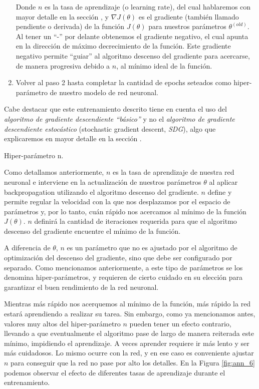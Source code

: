 \documentclass[12pt,a4paper]{article}
\makeatletter
\renewcommand\paragraph{\@startsection{paragraph}{4}{\z@}
            {-2.5ex\@plus -1ex \@minus -.25ex}
            {1.25ex \@plus .25ex}
            {\normalfont\normalsize\bfseries}}
\makeatother
\begin{document}
\begin{sloppypar}
\begin{enumerate}
Donde $n$ es la tasa de aprendizaje (o learning rate), del cual hablaremos con mayor detalle en la sección \textit{}, y $\nabla J(\theta)$ es el gradiente (también llamado pendiente o derivada) de la función $J(\theta)$ para nuestros parámetros $\theta^{(old)}$. Al tener un “-” por delante obtenemos el gradiente negativo, el cual apunta en la dirección de máximo decrecimiento de la función. Este gradiente negativo permite “guiar” al algoritmo descenso del gradiente para acercarse, de manera progresiva debido a $n$, al mínimo ideal de la función.      

\item Volver al paso 2 hasta completar la cantidad de epochs seteados como hiper-parámetro de nuestro modelo de red neuronal. 

\end{enumerate}

Cabe destacar que este entrenamiento descrito tiene en cuenta el uso del \textit{algoritmo de gradiente descendiente “básico”} y no el \textit{algoritmo de gradiente descendiente estocástico} (stochastic gradient descent, \textit{SDG}), algo que explicaremos en mayor detalle en la sección \textit{}.

\paragraph{Hiper-parámetro n.}\label{hiper_n}

Como detallamos anteriormente, $n$ es la tasa de aprendizaje de nuestra red neuronal e interviene en la actualización de nuestros parámetros $\theta$ al aplicar backpropagation utilizando el algoritmo descenso del gradiente. $n$ define y permite regular la velocidad con la que nos desplazamos por el espacio de parámetros y, por lo tanto, cuán rápido nos acercamos al mínimo de la función $J(\theta)$. $n$ definirá la cantidad de iteraciones requerida para que el algoritmo descenso del gradiente encuentre el mínimo de la función.

A diferencia de $\theta$, $n$ es un parámetro que no es ajustado por el algoritmo de optimización del descenso del gradiente, sino que debe ser configurado por separado. Como mencionamos anteriormente, a este tipo de parámetros se los denomina hiper-parámetros, y requieren de cierto cuidado en su elección para garantizar el buen rendimiento de la red neuronal. 

Mientras más rápido nos acerquemos al mínimo de la función, más rápido la red estará aprendiendo a realizar su tarea. Sin embargo, como ya mencionamos antes, valores muy altos del hiper-parámetro $n$ pueden tener un efecto contrario, llevando a que eventualmente el algoritmo pase de largo de manera reiterada este mínimo, impidiendo el aprendizaje. A veces aprender requiere ir más lento y ser más cuidadosos. Lo mismo ocurre con la red, y en ese caso es conveniente ajustar $n$ para conseguir que la red no pase por alto los detalles. En la Figura \ref{fig:ann_6} podemos observar el efecto de diferentes tasas de aprendizaje durante el entrenamiento. 


\end{sloppypar}
\end{document}
